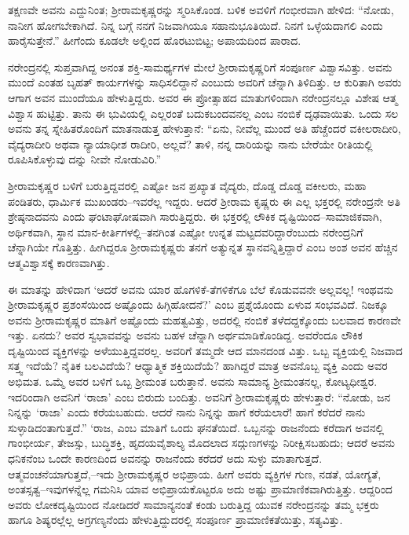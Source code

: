 ತಕ್ಷಣವೇ ಅವನು ಎದ್ದುನಿಂತ; ಶ್ರೀರಾಮಕೃಷ್ಣರನ್ನು ಸ್ಮರಿಸಿಕೊಂಡ. ಬಳಿಕ ಅವಳಿಗೆ ಗಂಭೀರವಾಗಿ ಹೇಳಿದ: “ನೋಡು, ನಾನೀಗ ಹೋಗಬೇಕಾಗಿದೆ. ನಿನ್ನ ಬಗ್ಗೆ ನನಗೆ ನಿಜವಾಗಿಯೂ ಸಹಾನುಭೂತಿಯಿದೆ. ನಿನಗೆ ಒಳ್ಳೆಯದಾಗಲಿ ಎಂದು ಹಾರೈಸುತ್ತೇನೆ.” ಹೀಗೆಂದು ಕೂಡಲೇ ಅಲ್ಲಿಂದ ಹೊರಟುಬಿಟ್ಟ; ಅಪಾಯದಿಂದ ಪಾರಾದ.

ನರೇಂದ್ರನಲ್ಲಿ ಸುಪ್ತವಾಗಿದ್ದ ಅನಂತ ಶಕ್ತಿ-ಸಾಮರ್ಥ್ಯಗಳ ಮೇಲೆ ಶ್ರೀರಾಮಕೃಷ್ಣರಿಗೆ ಸಂಪೂರ್ಣ ವಿಶ್ವಾಸವಿತ್ತು. ಅವನು ಮುಂದೆ ಎಂತಹ ಬೃಹತ್ ಕಾರ್ಯಗಳನ್ನು ಸಾಧಿಸಲಿದ್ದಾನೆ ಎಂಬುದು ಅವರಿಗೆ ಚೆನ್ನಾಗಿ ತಿಳಿದಿತ್ತು. ಆ ಕುರಿತಾಗಿ ಅವರು ಆಗಾಗ ಅವನ ಮುಂದೆಯೂ ಹೇಳುತ್ತಿದ್ದರು. ಅವರ ಈ ಪ್ರೋತ್ಸಾಹದ ಮಾತುಗಳಿಂದಾಗಿ ನರೇಂದ್ರನಲ್ಲೂ ವಿಶೇಷ ಆತ್ಮ ವಿಶ್ವಾಸ ಹುಟ್ಟಿತ್ತು. ತಾನು ಈ ಭುವಿಯಲ್ಲಿ ಎಲ್ಲರಂತೆ ಬದುಕಬಂದವನಲ್ಲ ಎಂಬ ನಂಬಿಕೆ ದೃಢವಾಯಿತು. ಒಂದು ಸಲ ಅವನು ತನ್ನ ಸ್ನೇಹಿತರೊಂದಿಗೆ ಮಾತನಾಡುತ್ತ ಹೇಳುತ್ತಾನೆ: “ಏನು, ನೀವೆಲ್ಲ ಮುಂದೆ ಅತಿ ಹೆಚ್ಚೆಂದರೆ ವಕೀಲರಾದೀರಿ, ವೈದ್ಯರಾದೀರಿ ಅಥವಾ ನ್ಯಾಯಾಧೀಶ ರಾದೀರಿ, ಅಲ್ಲವೆ? ತಾಳಿ, ನನ್ನ ದಾರಿಯನ್ನು ನಾನು ಬೇರೆಯೇ ರೀತಿಯಲ್ಲಿ ರೂಪಿಸಿಕೊಳ್ಳುವು ದನ್ನು ನೀವೇ ನೋಡುವಿರಿ.”

ಶ್ರೀರಾಮಕೃಷ್ಣರ ಬಳಿಗೆ ಬರುತ್ತಿದ್ದವರಲ್ಲಿ ಎಷ್ಟೋ ಜನ ಪ್ರಖ್ಯಾತ ವೈದ್ಯರು, ದೊಡ್ಡ ದೊಡ್ಡ ವಕೀಲರು, ಮಹಾ ಪಂಡಿತರು, ಧಾರ್ಮಿಕ ಮುಖಂಡರು–ಇವರೆಲ್ಲ ಇದ್ದರು. ಆದರೆ ಶ್ರೀರಾಮ ಕೃಷ್ಣರು ಈ ಎಲ್ಲ ಭಕ್ತರಲ್ಲಿ ನರೇಂದ್ರನೇ ಅತಿ ಶ್ರೇಷ್ಠನಾದವನು ಎಂದು ಘಂಟಾಘೋಷವಾಗಿ ಸಾರುತ್ತಿದ್ದರು. ಈ ಭಕ್ತರಲ್ಲಿ ಲೌಕಿಕ ದೃಷ್ಟಿಯಿಂದ–ಸಾಮಾಜಿಕವಾಗಿ, ಅರ್ಥಿಕವಾಗಿ, ಸ್ಥಾನ ಮಾನ-ಕೀರ್ತಿಗಳಲ್ಲಿ–ತನಗಿಂತ ಎಷ್ಟೋ ಉನ್ನತ ಮಟ್ಟದವರಿದ್ದಾರೆಂಬುದು ನರೇಂದ್ರನಿಗೆ ಚೆನ್ನಾಗಿಯೇ ಗೊತ್ತಿತ್ತು. ಹೀಗಿದ್ದರೂ ಶ್ರೀರಾಮಕೃಷ್ಣರು ತನಗೆ ಅತ್ಯುನ್ನತ ಸ್ಥಾನವನ್ನಿತ್ತಿದ್ದಾರೆ ಎಂಬ ಅಂಶ ಅವನ ಹೆಚ್ಚಿನ ಆತ್ಮವಿಶ್ವಾಸಕ್ಕೆ ಕಾರಣವಾಗಿತ್ತು.

ಈ ಮಾತನ್ನು ಹೇಳಿದಾಗ ‘ಆದರೆ ಅವನು ಯಾರ ಹೊಗಳಿಕೆ-ತೆಗಳಿಕೆಗೂ ಬೆಲೆ ಕೊಡುವವನೇ ಅಲ್ಲವಲ್ಲ! ಇಂಥವನು ಶ್ರೀರಾಮಕೃಷ್ಣರ ಪ್ರಶಂಸೆಯಿಂದ ಅಷ್ಟೊಂದು ಹಿಗ್ಗಿಹೋದನೆ?’ ಎಂಬ ಪ್ರಶ್ನೆಯೊಂದು ಏಳುವ ಸಂಭವವಿದೆ. ನಿಜಕ್ಕೂ ಅವನು ಶ್ರೀರಾಮಕೃಷ್ಣರ ಮಾತಿಗೆ ಅಷ್ಟೊಂದು ಮಹತ್ವವಿತ್ತು, ಅದರಲ್ಲಿ ನಂಬಿಕೆ ತಳೆದದ್ದಕ್ಕೊಂದು ಬಲವಾದ ಕಾರಣವೇ ಇತ್ತು. ಏನದು? ಅವರ ಸ್ವಭಾವವನ್ನು ಅವನು ಬಹಳ ಚೆನ್ನಾಗಿ ಅರ್ಥಮಾಡಿಕೊಂಡಿದ್ದ. ಅವರೆಂದೂ ಲೌಕಿಕ ದೃಷ್ಟಿಯಿಂದ ವ್ಯಕ್ತಿಗಳನ್ನು ಅಳೆಯುತ್ತಿದ್ದವರಲ್ಲ. ಅವರಿಗೆ ತಮ್ಮದೇ ಆದ ಮಾನದಂಡ ವಿತ್ತು. ಒಬ್ಬ ವ್ಯಕ್ತಿಯಲ್ಲಿ ನಿಜವಾದ ಸತ್ತ್ವ ಇದೆಯೆ? ನೈತಿಕ ಬಲವಿದೆಯೆ? ಆಧ್ಯಾತ್ಮಿಕ ಶಕ್ತಿಯಿದೆಯೆ? ಹಾಗಿದ್ದರೆ ಮಾತ್ರ ಅವನೊಬ್ಬ ವ್ಯಕ್ತಿ ಎಂದು ಅವರ ಅಭಿಮತ. ಒಮ್ಮೆ ಅವರ ಬಳಿಗೆ ಒಬ್ಬ ಶ್ರೀಮಂತ ಬರುತ್ತಾನೆ. ಅವನು ಸಾಮಾನ್ಯ ಶ್ರೀಮಂತನಲ್ಲ, ಕೋಟ್ಯಧೀಶ್ವರ. ಇದರಿಂದಾಗಿ ಅವನಿಗೆ ‘ರಾಜಾ’ ಎಂಬ ಬಿರುದು ಬಂದಿತ್ತು. ಅವನಿಗೆ ಶ್ರೀರಾಮಕೃಷ್ಣರು ಹೇಳುತ್ತಾರೆ: “ನೋಡು, ಜನ ನಿನ್ನನ್ನು ‘ರಾಜಾ’ ಎಂದು ಕರೆಯಬಹುದು. ಆದರೆ ನಾನು ನಿನ್ನನ್ನು ಹಾಗೆ ಕರೆಯಲಾರೆ! ಹಾಗೆ ಕರೆದರೆ ನಾನು ಸುಳ್ಳಾಡಿದಂತಾಗುತ್ತದೆ.” ‘ರಾಜ, ಎಂಬ ಮಾತಿಗೆ ಒಂದು ಘನತೆಯಿದೆ. ಒಬ್ಬನನ್ನು ರಾಜನೆಂದು ಕರೆದಾಗ ಅವನಲ್ಲಿ ಗಾಂಭೀರ್ಯ, ತೇಜಸ್ಸು, ಬುದ್ಧಿಶಕ್ತಿ, ಹೃದಯವೈಶಾಲ್ಯ ಮೊದಲಾದ ಸದ್ಗುಣಗಳನ್ನು ನಿರೀಕ್ಷಿಸಬಹುದು; ಆದರೆ ಅವನು ಧನಿಕನೆಂಬ ಒಂದೇ ಕಾರಣದಿಂದ ಅವನನ್ನು ರಾಜನೆಂದು ಕರೆದರೆ ಅದು ಸುಳ್ಳು ಮಾತಾಗುತ್ತದೆ. ಆತ್ಮವಂಚನೆಯಾಗುತ್ತದೆ,–ಇದು ಶ್ರೀರಾಮಕೃಷ್ಣರ ಅಭಿಪ್ರಾಯ. ಹೀಗೆ ಅವರು ವ್ಯಕ್ತಿಗಳ ಗುಣ, ನಡತೆ, ಯೋಗ್ಯತೆ, ಅಂತಸ್ಸತ್ವ–ಇವುಗಳನ್ನೆಲ್ಲ ಗಮನಿಸಿ ಯಾವ ಅಭಿಪ್ರಾಯಕೊಟ್ಟರೂ ಅದು ಅಷ್ಟು ಪ್ರಾಮಾಣಿಕವಾಗಿರುತ್ತಿತ್ತು. ಆದ್ದರಿಂದ ಅವರು ಲೋಕದೃಷ್ಟಿಯಿಂದ ನೋಡಿದರೆ ಸಾಮಾನ್ಯನಂತೆ ಕಂಡು ಬರುತ್ತಿದ್ದ ಯುವಕ ನರೇಂದ್ರನನ್ನು ತಮ್ಮ ಭಕ್ತರು ಹಾಗೂ ಶಿಷ್ಯರಲ್ಲೆಲ್ಲ ಅಗ್ರಗಣ್ಯನೆಂದು ಹೇಳುತ್ತಿದ್ದುದರಲ್ಲಿ ಸಂಪೂರ್ಣ ಪ್ರಾಮಾಣಿಕತೆಯಿತ್ತು, ಸತ್ಯವಿತ್ತು.

